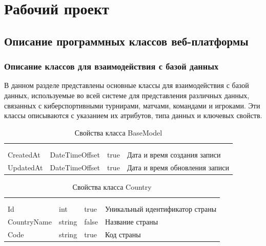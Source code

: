 \newsection
\section{Рабочий проект}
\subsection{Описание программных классов веб-платформы}
\subsubsection{Описание классов для взаимодействия с базой данных}

В данном разделе представлены основные классы для взаимодействия с базой данных, используемые во всей системе для представления различных данных, связанных с киберспортивными турнирами, матчами, командами и игроками. Эти классы описываются с указанием их атрибутов, типа данных и ключевых свойств.

\begin{xltabular}{\textwidth}{|X|X|X|X|}
	\caption{Свойства класса BaseModel}\label{table:BaseModel}\\ \hline
	 &  &  &  \\ \hline
	 &  &  &  \\ \hline
	\endfirsthead
	 \hline
	 &  &  &  \\ \hline
	\endhead
	CreatedAt & DateTimeOffset & true & Дата и время создания записи \\ \hline
	UpdatedAt & DateTimeOffset & true & Дата и время обновления записи \\ \hline
\end{xltabular}

\begin{xltabular}{\textwidth}{|X|X|X|X|}
	\caption{Свойства класса Country}\label{table:Country}\\ \hline
	 &  &  &  \\ \hline
	 &  &  &  \\ \hline
	\endfirsthead
	 \hline
	 &  &  &  \\ \hline
	\endhead
	Id & int & true & Уникальный идентификатор страны \\ \hline
	CountryName & string & false & Название страны \\ \hline
	Code & string & true & Код страны \\ \hline
\end{xltabular}

